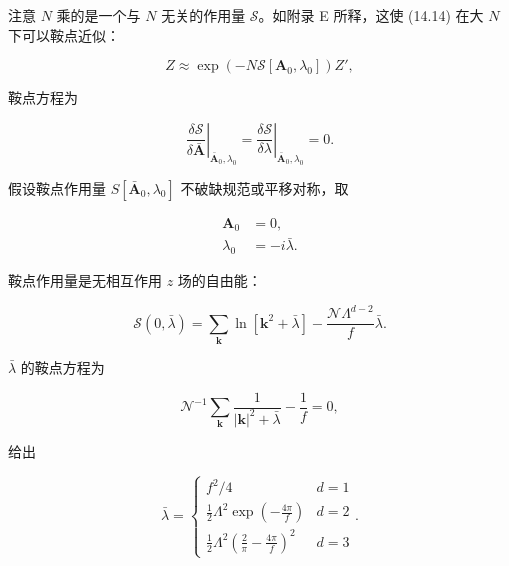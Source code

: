 注意 $N$ 乘的是一个与 $N$ 无关的作用量 $\mathcal{S}$。如附录 E 所释，这使 (14.14) 在大 $N$ 下可以鞍点近似：

\begin{equation*}
Z \approx \exp \left( - N \mathcal {S} [ \mathbf {A} _ {0}, \lambda_ {0} ] \right) Z ' ,
\tag{14.15}
\end{equation*}

鞍点方程为

\begin{equation*}
\left. \frac {\delta \mathcal {S}}{\delta \bar {\mathbf {A}}} \right| _ {\bar {\mathbf {A}} _ {0}, \lambda_ {0}} = \left. \frac {\delta \mathcal {S}}{\delta \lambda} \right| _ {\bar {\mathbf {A}} _ {0}, \lambda_ {0}} = 0.
\tag{14.16}
\end{equation*}

假设鞍点作用量 $S[\bar{\mathbf{A}}_{0}, \lambda_{0}]$ 不破缺规范或平移对称，取

\begin{align*}
\mathbf {A} _ {0} & = 0 ,\\
\lambda_ {0} & = - i \bar {\lambda} .
\tag{14.17}
\end{align*}

鞍点作用量是无相互作用 $z$ 场的自由能：

\begin{equation*}
\mathcal {S} ( 0, \bar {\lambda} ) = \sum_ {\mathbf {k}} \ln \left[ \mathbf {k} ^ {2} + \bar {\lambda} \right] - \frac {\mathcal {N} \Lambda^ {d - 2}}{f} \bar {\lambda}.
\tag{14.18}
\end{equation*}

$\bar{\lambda}$ 的鞍点方程为

\begin{equation*}
\mathcal {N} ^ {- 1} \sum_ {\mathbf {k}} \frac {1}{| \mathbf {k} | ^ {2} + \bar {\lambda}} - \frac {1}{f} = 0 ,
\tag{14.19}
\end{equation*}

给出

\begin{equation*}
\bar {\lambda} = \left\{ \begin{array}{ll} f ^ {2} / 4 & d = 1 \\[2pt] \frac {1}{2} \Lambda^ {2} \exp \left( - \frac {4 \pi}{f} \right) & d = 2 \\[4pt] \frac {1}{2} \Lambda^ {2} \left( \frac {2}{\pi} - \frac {4 \pi}{f} \right) ^ {2} & d = 3 \end{array} \right..
\tag{14.20}
\end{equation*}

